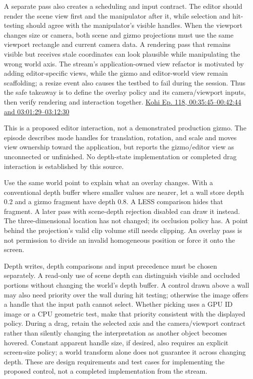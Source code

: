 A separate pass also creates a scheduling and input contract. The editor should render the scene view first and the manipulator after it, while selection and hit-testing should agree with the manipulator's visible handles. When the viewport changes size or camera, both scene and gizmo projections must use the same viewport rectangle and current camera data. A rendering pass that remains visible but receives stale coordinates can look plausible while manipulating the wrong world axis. The stream's application-owned view refactor is motivated by adding editor-specific views, while the gizmo and editor-world view remain scaffolding; a resize event also causes the testbed to fail during the session. Thus the safe takeaway is to define the overlay policy and its camera/viewport inputs, then verify rendering and interaction together. \href{https://www.youtube.com/watch?v=CjJqa3iILAQ&t=2145s}{Kohi Ep. 118, 00:35:45--00:42:44 and 03:01:29--03:12:30}

This is a proposed editor interaction, not a demonstrated production gizmo. The episode describes mode handles for translation, rotation, and scale and moves view ownership toward the application, but reports the gizmo/editor view as unconnected or unfinished. No depth-state implementation or completed drag interaction is established by this source.

Use the same world point to explain what an overlay changes. With a conventional depth buffer where smaller values are nearer, let a wall store depth 0.2 and a gizmo fragment have depth 0.8. A LESS comparison hides that fragment. A later pass with scene-depth rejection disabled can draw it instead. The three-dimensional location has not changed; its occlusion policy has. A point behind the projection's valid clip volume still needs clipping. An overlay pass is not permission to divide an invalid homogeneous position or force it onto the screen.

Depth writes, depth comparisons and input precedence must be chosen separately. A read-only use of scene depth can distinguish visible and occluded portions without changing the world's depth buffer. A control drawn above a wall may also need priority over the wall during hit testing; otherwise the image offers a handle that the input path cannot select. Whether picking uses a GPU ID image or a CPU geometric test, make that priority consistent with the displayed policy. During a drag, retain the selected axis and the camera/viewport contract rather than silently changing the interpretation as another object becomes hovered. Constant apparent handle size, if desired, also requires an explicit screen-size policy; a world transform alone does not guarantee it across changing depth. These are design requirements and test cases for implementing the proposed control, not a completed implementation from the stream.

